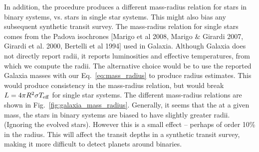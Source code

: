 \documentclass{emulateapj}
\begin{document}
In addition, the procedure produces a different mass-radius relation 
for stars in binary systems, vs. stars in single star systems.
This might also bias any subsequent synthetic transit survey.
The mass-radius relation for single stars comes from the Padova isochrones 
[Marigo et al 2008, Marigo \& Girardi 2007, Girardi et al. 2000, Bertelli et al 
1994] used in Galaxia.
Although Galaxia does not directly report radii, it reports luminosities and 
effective temperatures, from which we compute the radii.
The alternative choice would be to use the reported Galaxia masses with our 
Eq.~\ref{eq:mass_radius} to produce radius estimates.
This would produce consistency in the mass-radius relation, but would break $L 
= 4\pi R^2 \sigma T_{\rm eff}$ for single star systems.
The different mass-radius relations are shown in 
Fig.~\ref{fig:galaxia_mass_radius}.
Generally, it seems that the at a given mass, the stars in binary systems are 
biased to have slightly greater radii. (Ignoring the evolved stars).
However this is a small effect -- perhaps of order 10\% in the radius.
This will affect the transit depths in a synthetic transit survey, making it 
more difficult to detect planets around binaries.
\end{document}
